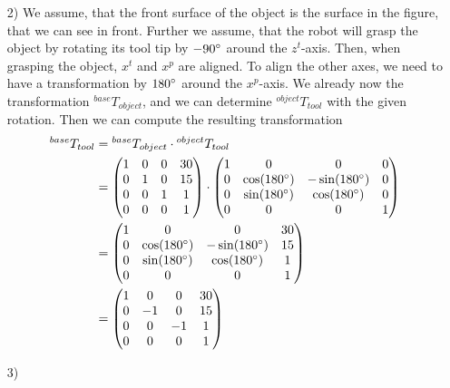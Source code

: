 \documentclass[a4paper,11pt]{article}
\begin{document}
\begin {enumerate}
\begin{enumerate}
        \item[2)]
        We assume, that the front surface of the object is the surface in the figure, that we can see in front. Further we assume, that the robot will grasp the object by rotating its tool tip by $-90\degree$ around the $z^t$-axis. Then, when grasping the object, $x^t$ and $x^p$ are aligned. To align the other axes, we need to have a transformation by $180\degree$ around the $x^p$-axis. We already now the transformation ${^{base}T_{object}}$, and we can determine ${^{object}T_{tool}}$ with the given rotation. Then we can compute the resulting transformation
        \begin{align*}
          {^{base}T_{tool}} &= {^{base}T_{object}} \cdot {^{object}T_{tool}}\\
          &= \begin{pmatrix}
            1 & 0 & 0 & 30\\
            0 & 1 & 0 & 15\\
            0 & 0 & 1 & 1\\
            0 & 0 & 0 & 1
          \end{pmatrix} \cdot \begin{pmatrix}
            1 & 0 & 0 & 0\\
            0 & \cos(180\degree) & -\sin(180\degree) & 0\\
            0 & \sin(180\degree) & \cos(180\degree) & 0\\
            0 & 0 & 0 & 1
          \end{pmatrix}\\
          &= \begin{pmatrix}
            1 & 0 & 0 & 30\\
            0 & \cos(180\degree) & -\sin(180\degree) & 15\\
            0 & \sin(180\degree) & \cos(180\degree) & 1\\
            0 & 0 & 0 & 1
          \end{pmatrix}\\
          &= \begin{pmatrix}
            1 & 0 & 0 & 30\\
            0 & -1 & 0 & 15\\
            0 & 0 & -1 & 1\\
            0 & 0 & 0 & 1
          \end{pmatrix}
        \end{align*}

        \item[3)]




\end{enumerate}
\end{enumerate}
\end{document}
